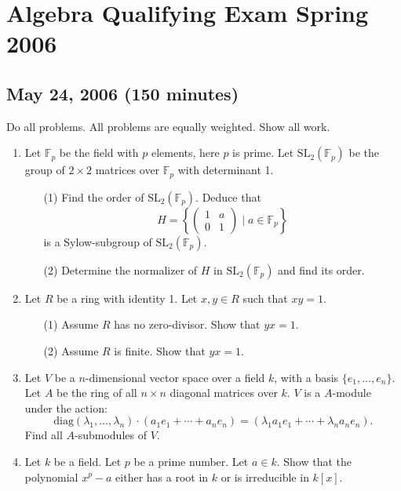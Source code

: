 \documentclass{article}
\begin{document}
\section*{Algebra Qualifying Exam Spring 2006}
\subsection*{May 24, 2006 (150 minutes)}

Do all problems. All problems are equally weighted. Show all work.

\begin{enumerate}
    \item Let \(\mathbb{F}_p\) be the field with \(p\) elements, here \(p\) is prime. Let \(\text{SL}_2(\mathbb{F}_p)\) be the group of \(2 \times 2\) matrices over \(\mathbb{F}_p\) with determinant 1.
    \begin{itemize}
        \item[(1)] Find the order of \(\text{SL}_2(\mathbb{F}_p)\). Deduce that
        \[H = \left\{ \begin{pmatrix} 1 & a \\ 0 & 1 \end{pmatrix} \mid a \in \mathbb{F}_p \right\}\]
        is a Sylow-subgroup of \(\text{SL}_2(\mathbb{F}_p)\).
        \item[(2)] Determine the normalizer of \(H\) in \(\text{SL}_2(\mathbb{F}_p)\) and find its order.
    \end{itemize}

    \item Let \(R\) be a ring with identity 1. Let \(x, y \in R\) such that \(xy = 1\).
    \begin{itemize}
        \item[(1)] Assume \(R\) has no zero-divisor. Show that \(yx = 1\).
        \item[(2)] Assume \(R\) is finite. Show that \(yx = 1\).
    \end{itemize}

    \item Let \(V\) be a \(n\)-dimensional vector space over a field \(k\), with a basis \(\{e_1, \ldots, e_n\}\). Let \(A\) be the ring of all \(n \times n\) diagonal matrices over \(k\). \(V\) is a \(A\)-module under the action:
    \[\text{diag}(\lambda_1, \ldots, \lambda_n) \cdot (a_1 e_1 + \cdots + a_n e_n) = (\lambda_1 a_1 e_1 + \cdots + \lambda_n a_n e_n).\]
    Find all \(A\)-submodules of \(V\).

    \item Let \(k\) be a field. Let \(p\) be a prime number. Let \(a \in k\). Show that the polynomial \(x^p - a\) either has a root in \(k\) or is irreducible in \(k[x]\).


\end{enumerate}
\end{document}
